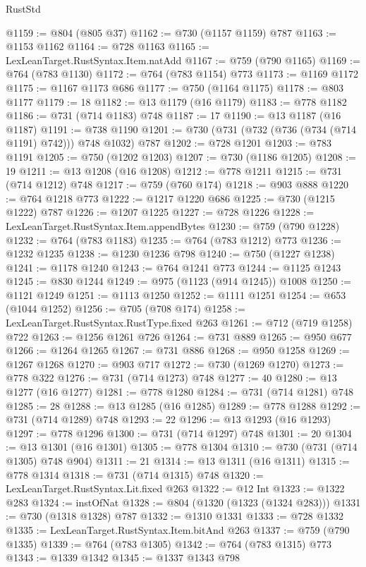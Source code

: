 \begin{lexlean}{RustStd}
\begin{coremodule}
@1159 := @804 (@805 @37)
@1162 := @730 (@1157 @1159) @787
@1163 := @1153 @1162
@1164 := @728 @1163
@1165 := LexLeanTarget.RustSyntax.Item.natAdd
@1167 := @759 (@790 @1165)
@1169 := @764 (@783 @1130)
@1172 := @764 (@783 @1154) @773
@1173 := @1169 @1172
@1175 := @1167 @1173 @686
@1177 := @750 (@1164 @1175)
@1178 := @803 @1177
@1179 := 18
@1182 := @13 @1179 (@16 @1179)
@1183 := @778 @1182
@1186 := @731 (@714 @1183) @748
@1187 := 17
@1190 := @13 @1187 (@16 @1187)
@1191 := @738 @1190
@1201 := @730 (@731 (@732 (@736 (@734 (@714 @1191) @742))) @748 @1032) @787
@1202 := @728 @1201
@1203 := @783 @1191
@1205 := @750 (@1202 @1203)
@1207 := @730 (@1186 @1205)
@1208 := 19
@1211 := @13 @1208 (@16 @1208)
@1212 := @778 @1211
@1215 := @731 (@714 @1212) @748
@1217 := @759 (@760 @174)
@1218 := @903 @888
@1220 := @764 @1218 @773
@1222 := @1217 @1220 @686
@1225 := @730 (@1215 @1222) @787
@1226 := @1207 @1225
@1227 := @728 @1226
@1228 := LexLeanTarget.RustSyntax.Item.appendBytes
@1230 := @759 (@790 @1228)
@1232 := @764 (@783 @1183)
@1235 := @764 (@783 @1212) @773
@1236 := @1232 @1235
@1238 := @1230 @1236 @798
@1240 := @750 (@1227 @1238)
@1241 := @1178 @1240
@1243 := @764 @1241 @773
@1244 := @1125 @1243
@1245 := @830 @1244
@1249 := @975 (@1123 (@914 @1245)) @1008
@1250 := @1121 @1249
@1251 := @1113 @1250
@1252 := @1111 @1251
@1254 := @653 (@1044 @1252)
@1256 := @705 (@708 @174)
@1258 := LexLeanTarget.RustSyntax.RustType.fixed @263
@1261 := @712 (@719 @1258) @722
@1263 := @1256 @1261 @726
@1264 := @731 @889
@1265 := @950 @677
@1266 := @1264 @1265
@1267 := @731 @886
@1268 := @950 @1258
@1269 := @1267 @1268
@1270 := @903 @717
@1272 := @730 (@1269 @1270)
@1273 := @778 @322
@1276 := @731 (@714 @1273) @748
@1277 := 40
@1280 := @13 @1277 (@16 @1277)
@1281 := @778 @1280
@1284 := @731 (@714 @1281) @748
@1285 := 28
@1288 := @13 @1285 (@16 @1285)
@1289 := @778 @1288
@1292 := @731 (@714 @1289) @748
@1293 := 22
@1296 := @13 @1293 (@16 @1293)
@1297 := @778 @1296
@1300 := @731 (@714 @1297) @748
@1301 := 20
@1304 := @13 @1301 (@16 @1301)
@1305 := @778 @1304
@1310 := @730 (@731 (@714 @1305) @748 @904)
@1311 := 21
@1314 := @13 @1311 (@16 @1311)
@1315 := @778 @1314
@1318 := @731 (@714 @1315) @748
@1320 := LexLeanTarget.RustSyntax.Lit.fixed @263
@1322 := @12 Int
@1323 := @1322 @283
@1324 := instOfNat
@1328 := @804 (@1320 (@1323 (@1324 @283)))
@1331 := @730 (@1318 @1328) @787
@1332 := @1310 @1331
@1333 := @728 @1332
@1335 := LexLeanTarget.RustSyntax.Item.bitAnd @263
@1337 := @759 (@790 @1335)
@1339 := @764 (@783 @1305)
@1342 := @764 (@783 @1315) @773
@1343 := @1339 @1342
@1345 := @1337 @1343 @798

\end{coremodule}
\end{lexlean}
